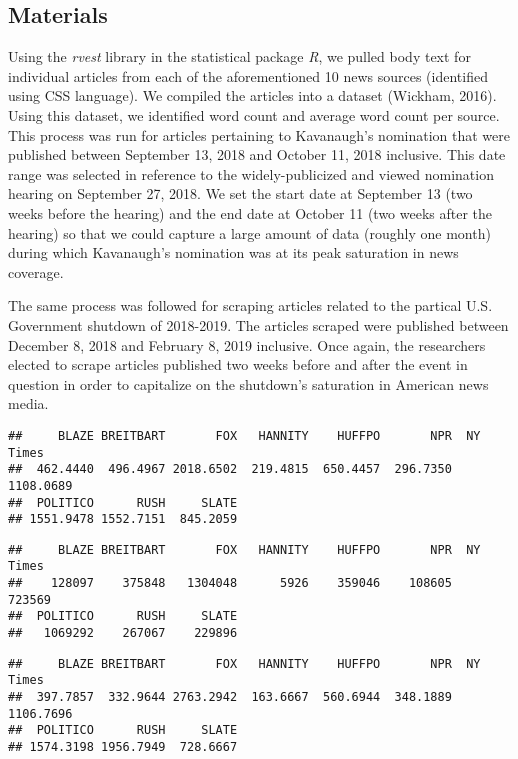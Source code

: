 \documentclass[english,,man]{apa6}
\begin{document}
\hypertarget{materials-1}{%
\subsection{Materials}\label{materials-1}}

Using the \emph{rvest} library in the statistical package \emph{R}, we pulled body text for individual articles from each of the aforementioned 10 news sources (identified using CSS language). We compiled the articles into a dataset (Wickham, 2016). Using this dataset, we identified word count and average word count per source. This process was run for articles pertaining to Kavanaugh's nomination that were published between September 13, 2018 and October 11, 2018 inclusive. This date range was selected in reference to the widely-publicized and viewed nomination hearing on September 27, 2018. We set the start date at September 13 (two weeks before the hearing) and the end date at October 11 (two weeks after the hearing) so that we could capture a large amount of data (roughly one month) during which Kavanaugh's nomination was at its peak saturation in news coverage.

The same process was followed for scraping articles related to the partical U.S. Government shutdown of 2018-2019. The articles scraped were published between December 8, 2018 and February 8, 2019 inclusive. Once again, the researchers elected to scrape articles published two weeks before and after the event in question in order to capitalize on the shutdown's saturation in American news media.

\begin{verbatim}
##     BLAZE BREITBART       FOX   HANNITY    HUFFPO       NPR  NY Times 
##  462.4440  496.4967 2018.6502  219.4815  650.4457  296.7350 1108.0689 
##  POLITICO      RUSH     SLATE 
## 1551.9478 1552.7151  845.2059
\end{verbatim}

\begin{verbatim}
##     BLAZE BREITBART       FOX   HANNITY    HUFFPO       NPR  NY Times 
##    128097    375848   1304048      5926    359046    108605    723569 
##  POLITICO      RUSH     SLATE 
##   1069292    267067    229896
\end{verbatim}

\begin{verbatim}
##     BLAZE BREITBART       FOX   HANNITY    HUFFPO       NPR  NY Times 
##  397.7857  332.9644 2763.2942  163.6667  560.6944  348.1889 1106.7696 
##  POLITICO      RUSH     SLATE 
## 1574.3198 1956.7949  728.6667
\end{verbatim}
\end{document}
